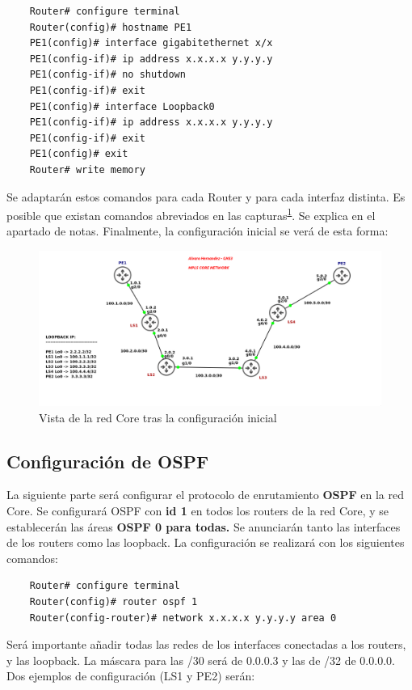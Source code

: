 \documentclass{article}
\begin{document}
\begin{verbatim}
    Router# configure terminal
    Router(config)# hostname PE1
    PE1(config)# interface gigabitethernet x/x
    PE1(config-if)# ip address x.x.x.x y.y.y.y
    PE1(config-if)# no shutdown
    PE1(config-if)# exit
    PE1(config)# interface Loopback0
    PE1(config-if)# ip address x.x.x.x y.y.y.y
    PE1(config-if)# exit
    PE1(config)# exit
    Router# write memory
\end{verbatim}
Se adaptarán estos comandos para cada Router y para cada interfaz distinta. Es posible que existan comandos abreviados en las capturas\textsuperscript{\hyperlink{nota1}{1}}. Se explica en el apartado de notas.
Finalmente, la configuración inicial se verá de esta forma:
\begin{figure}[h]
    \centering
    \includegraphics[width=1\textwidth]{src/primerafigura.png}
    \caption{Vista de la red Core tras la configuración inicial}
\end{figure}

\subsection{Configuración de OSPF}

La siguiente parte será configurar el protocolo de enrutamiento \textbf{OSPF} en la red Core. Se configurará OSPF con \textbf{id 1} en todos los routers de la red Core, y se establecerán las áreas \textbf{OSPF 0 para todas.} Se anunciarán tanto las interfaces de los routers como las loopback. La configuración se realizará con los siguientes comandos:

\begin{verbatim}
    Router# configure terminal
    Router(config)# router ospf 1
    Router(config-router)# network x.x.x.x y.y.y.y area 0
\end{verbatim}

Será importante añadir todas las redes de los interfaces conectadas a los routers, y las loopback. La máscara para las /30 será de 0.0.0.3 y las de /32 de 0.0.0.0. Dos ejemplos de configuración (LS1 y PE2) serán:
\end{document}
